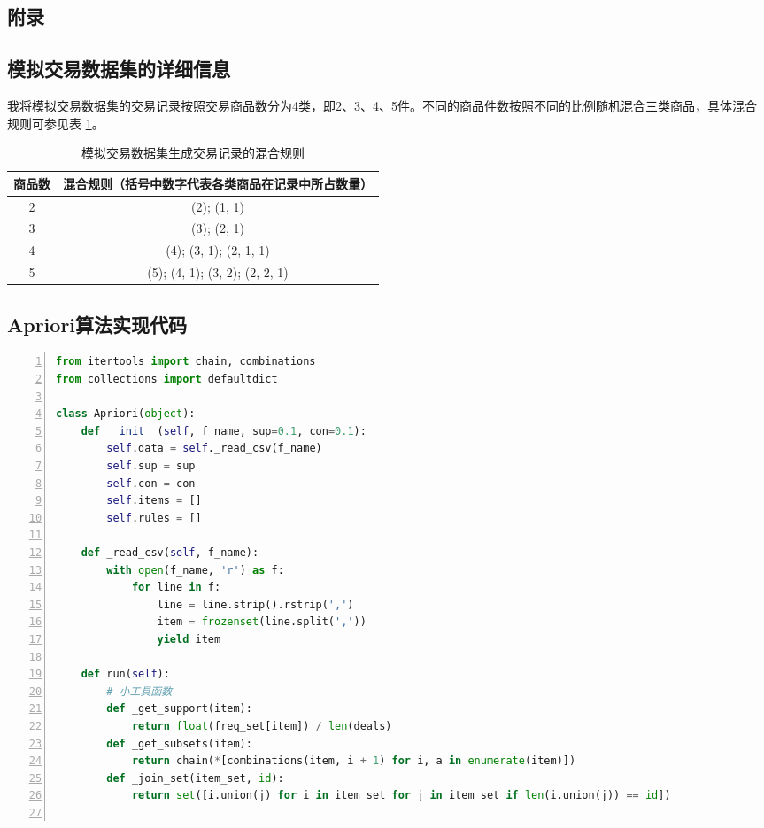 \documentclass[12pt,a4paper]{article}
\theoremstyle{definition}
\begin{document}
\newpage
\begin{appendix}
	\section{附录}
	\subsection{模拟交易数据集的详细信息}
	\label{apd:dataset}
	
	我将模拟交易数据集的交易记录按照交易商品数分为4类，即2、3、4、5件。不同的商品件数按照不同的比例随机混合三类商品，具体混合规则可参见表 \ref{tab:dataset}。
	
	\begin{table}[H]
		\renewcommand\arraystretch{1.35}
		\caption{模拟交易数据集生成交易记录的混合规则}
		\label{tab:dataset}
		\centering
		
		\begin{tabular}{c|c}
			\centering
			商品数 & 混合规则（括号中数字代表各类商品在记录中所占数量） \\
			\hline
			2 & (2); (1, 1) \\
			3 & (3); (2, 1) \\
			4 & (4); (3, 1); (2, 1, 1) \\
			5 & (5); (4, 1); (3, 2); (2, 2, 1) \\		
		\end{tabular}
	\end{table}
	
	
	\subsection{Apriori算法实现代码}
	\label{apd:code}
	
	\begin{lstlisting}[language=Python,
	numbers=left,
	keywordstyle=\color{blue!70},
	frame=shadowbox,
	breaklines=True]
from itertools import chain, combinations
from collections import defaultdict

class Apriori(object):
    def __init__(self, f_name, sup=0.1, con=0.1):
        self.data = self._read_csv(f_name)
        self.sup = sup
        self.con = con
        self.items = []
        self.rules = []

    def _read_csv(self, f_name):
        with open(f_name, 'r') as f:
            for line in f:
                line = line.strip().rstrip(',')
                item = frozenset(line.split(','))
                yield item

    def run(self):
        # 小工具函数
        def _get_support(item):
            return float(freq_set[item]) / len(deals)
        def _get_subsets(item):
            return chain(*[combinations(item, i + 1) for i, a in enumerate(item)])
        def _join_set(item_set, id):
            return set([i.union(j) for i in item_set for j in item_set if len(i.union(j)) == id])


\end{lstlisting}
\end{appendix}
\end{document}
